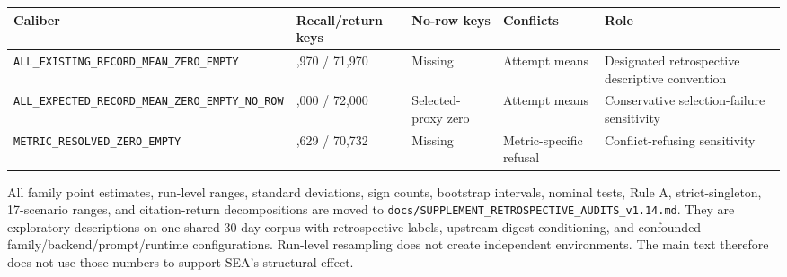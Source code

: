 \documentclass[
  11pt]{article}
\begin{document}
\begin{longtable}[]{@{}
  >{\raggedright\arraybackslash}p{}
  >{\raggedleft\arraybackslash}p{}
  >{\raggedright\arraybackslash}p{}
  >{\raggedright\arraybackslash}p{}
  >{\raggedright\arraybackslash}p{}@{}}
\toprule\noalign{}
\begin{minipage}[b]{\linewidth}\raggedright
Caliber
\end{minipage} & \begin{minipage}[b]{\linewidth}\raggedleft
Recall/return keys
\end{minipage} & \begin{minipage}[b]{\linewidth}\raggedright
No-row keys
\end{minipage} & \begin{minipage}[b]{\linewidth}\raggedright
Conflicts
\end{minipage} & \begin{minipage}[b]{\linewidth}\raggedright
Role
\end{minipage} \\
\midrule\noalign{}
\endhead
\bottomrule\noalign{}
\endlastfoot
\texttt{ALL\_EXISTING\_}\allowbreak \texttt{RECORD\_MEAN\_}\allowbreak \texttt{ZERO\_EMPTY}
& 71,970 / 71,970 & Missing & Attempt means & Designated retrospective
descriptive convention \\
\texttt{ALL\_EXPECTED\_}\allowbreak \texttt{RECORD\_MEAN\_}\allowbreak \texttt{ZERO\_EMPTY\_}\allowbreak \texttt{NO\_ROW}
& 72,000 / 72,000 & Selected-proxy zero & Attempt means & Conservative
selection-failure sensitivity \\
\texttt{METRIC\_RESOLVED\_}\allowbreak \texttt{ZERO\_EMPTY} & 71,629 /
70,732 & Missing & Metric-specific refusal & Conflict-refusing
sensitivity \\
\end{longtable}

All family point estimates, run-level ranges, standard deviations, sign
counts, bootstrap intervals, nominal tests, Rule A, strict-singleton,
17-scenario ranges, and citation-return decompositions are moved to
\texttt{docs/SUPPLEMENT\_RETROSPECTIVE\_AUDITS\_v1.14.md}. They are
exploratory descriptions on one shared 30-day corpus with retrospective
labels, upstream digest conditioning, and confounded
family/backend/prompt/runtime configurations. Run-level resampling does
not create independent environments. The main text therefore does not
use those numbers to support SEA's structural effect.
\end{document}
